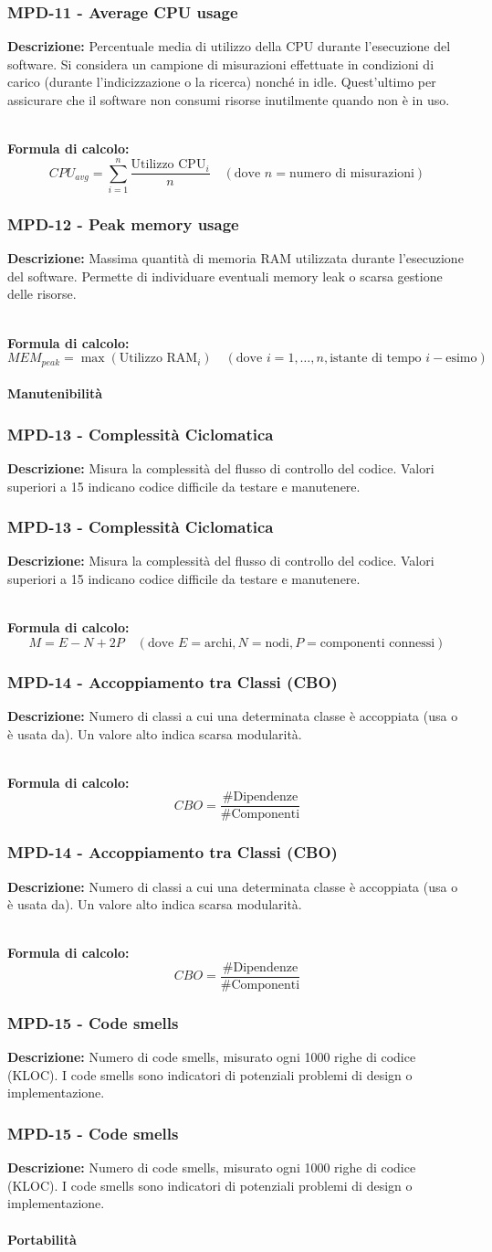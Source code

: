 \documentclass[a4paper,12pt]{article}
\newcommand{\metricdef}[3]{
    \subsubsection*{#1 - #2}
    \textbf{Descrizione:} #3
}
\newcommand{\metricformula}[1]{
    \\[0.5em]
    \textbf{Formula di calcolo:}
    \begin{equation*}
        #1
    \end{equation*}
}
\begin{document}
\metricdef{MPD-11}{Average CPU usage}{Percentuale media di utilizzo della CPU durante l'esecuzione del software. Si considera un campione di misurazioni effettuate in condizioni di carico (durante l'indicizzazione o la ricerca) nonché in idle. Quest'ultimo per assicurare che il software non consumi risorse inutilmente quando non è in uso.}
\metricformula{CPU_{avg} = \sum_{i=1}^{n} \frac{\text{Utilizzo CPU}_i}{n} \quad (\text{dove }n = \text{numero di misurazioni})}

\newpage

\metricdef{MPD-12}{Peak memory usage}{Massima quantità di memoria RAM utilizzata durante l'esecuzione del software. Permette di individuare eventuali memory leak o scarsa gestione delle risorse.}
\metricformula{MEM_{peak} = \max(\text{Utilizzo RAM}_i) \quad (\text{dove }i = 1, \dots, n, \text{istante di tempo } i-\text{esimo})}

\paragraph{Manutenibilità}

\metricdef{MPD-13}{Complessità Ciclomatica}{Misura la complessità del flusso di controllo del codice. Valori superiori a 15 indicano codice difficile da testare e manutenere.}
\metricdef{MPD-13}{Complessità Ciclomatica}{Misura la complessità del flusso di controllo del codice. Valori superiori a 15 indicano codice difficile da testare e manutenere.}
\metricformula{M = E - N + 2P \quad (\text{dove } E=\text{archi}, N=\text{nodi}, P=\text{componenti connessi})}

\metricdef{MPD-14}{Accoppiamento tra Classi (CBO)}{Numero di classi a cui una determinata classe è accoppiata (usa o è usata da). Un valore alto indica scarsa modularità.}
\metricformula{CBO = \frac{\#\text{Dipendenze}}{\#\text{Componenti}}}
\metricdef{MPD-14}{Accoppiamento tra Classi (CBO)}{Numero di classi a cui una determinata classe è accoppiata (usa o è usata da). Un valore alto indica scarsa modularità.}
\metricformula{CBO = \frac{\#\text{Dipendenze}}{\#\text{Componenti}}}

\metricdef{MPD-15}{Code smells}{Numero di code smells, misurato ogni 1000 righe di codice (KLOC). I code smells sono indicatori di potenziali problemi di design o implementazione.}
\metricdef{MPD-15}{Code smells}{Numero di code smells, misurato ogni 1000 righe di codice (KLOC). I code smells sono indicatori di potenziali problemi di design o implementazione.}

\paragraph{Portabilità}
\end{document}
